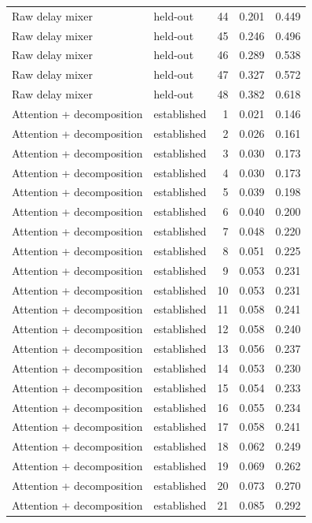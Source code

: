 \begin{tabular}{llrrr}
Raw delay mixer & held-out & 44 & 0.201 & 0.449 \\
Raw delay mixer & held-out & 45 & 0.246 & 0.496 \\
Raw delay mixer & held-out & 46 & 0.289 & 0.538 \\
Raw delay mixer & held-out & 47 & 0.327 & 0.572 \\
Raw delay mixer & held-out & 48 & 0.382 & 0.618 \\
Attention + decomposition & established & 1 & 0.021 & 0.146 \\
Attention + decomposition & established & 2 & 0.026 & 0.161 \\
Attention + decomposition & established & 3 & 0.030 & 0.173 \\
Attention + decomposition & established & 4 & 0.030 & 0.173 \\
Attention + decomposition & established & 5 & 0.039 & 0.198 \\
Attention + decomposition & established & 6 & 0.040 & 0.200 \\
Attention + decomposition & established & 7 & 0.048 & 0.220 \\
Attention + decomposition & established & 8 & 0.051 & 0.225 \\
Attention + decomposition & established & 9 & 0.053 & 0.231 \\
Attention + decomposition & established & 10 & 0.053 & 0.231 \\
Attention + decomposition & established & 11 & 0.058 & 0.241 \\
Attention + decomposition & established & 12 & 0.058 & 0.240 \\
Attention + decomposition & established & 13 & 0.056 & 0.237 \\
Attention + decomposition & established & 14 & 0.053 & 0.230 \\
Attention + decomposition & established & 15 & 0.054 & 0.233 \\
Attention + decomposition & established & 16 & 0.055 & 0.234 \\
Attention + decomposition & established & 17 & 0.058 & 0.241 \\
Attention + decomposition & established & 18 & 0.062 & 0.249 \\
Attention + decomposition & established & 19 & 0.069 & 0.262 \\
Attention + decomposition & established & 20 & 0.073 & 0.270 \\
Attention + decomposition & established & 21 & 0.085 & 0.292 \\

\end{tabular}
